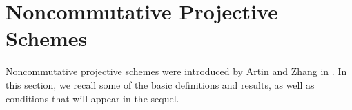 \chapter{Noncommutative Projective Schemes}\label{chapter: background on NCP}

Noncommutative projective schemes were introduced by Artin and Zhang in \parencite{AZ94}.
In this section, we recall some of the basic definitions and results, as well as conditions that will appear in the sequel.



